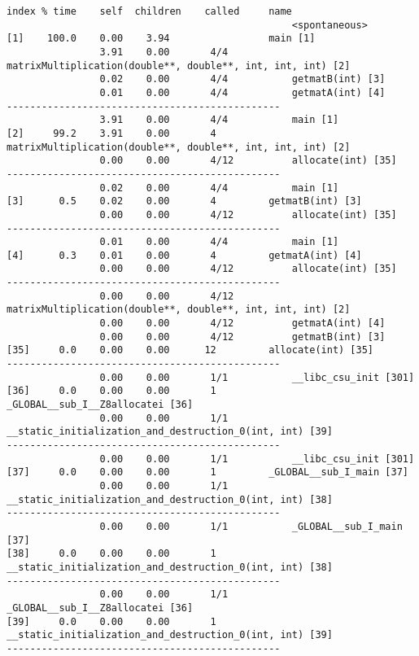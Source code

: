 \documentclass[7pt]{article}
\begin{document}
\begin{verbatim}
index % time    self  children    called     name
                                                 <spontaneous>
[1]    100.0    0.00    3.94                 main [1]
                3.91    0.00       4/4           matrixMultiplication(double**, double**, int, int, int) [2]
                0.02    0.00       4/4           getmatB(int) [3]
                0.01    0.00       4/4           getmatA(int) [4]
-----------------------------------------------
                3.91    0.00       4/4           main [1]
[2]     99.2    3.91    0.00       4         matrixMultiplication(double**, double**, int, int, int) [2]
                0.00    0.00       4/12          allocate(int) [35]
-----------------------------------------------
                0.02    0.00       4/4           main [1]
[3]      0.5    0.02    0.00       4         getmatB(int) [3]
                0.00    0.00       4/12          allocate(int) [35]
-----------------------------------------------
                0.01    0.00       4/4           main [1]
[4]      0.3    0.01    0.00       4         getmatA(int) [4]
                0.00    0.00       4/12          allocate(int) [35]
-----------------------------------------------
                0.00    0.00       4/12          matrixMultiplication(double**, double**, int, int, int) [2]
                0.00    0.00       4/12          getmatA(int) [4]
                0.00    0.00       4/12          getmatB(int) [3]
[35]     0.0    0.00    0.00      12         allocate(int) [35]
-----------------------------------------------
                0.00    0.00       1/1           __libc_csu_init [301]
[36]     0.0    0.00    0.00       1         _GLOBAL__sub_I__Z8allocatei [36]
                0.00    0.00       1/1           __static_initialization_and_destruction_0(int, int) [39]
-----------------------------------------------
                0.00    0.00       1/1           __libc_csu_init [301]
[37]     0.0    0.00    0.00       1         _GLOBAL__sub_I_main [37]
                0.00    0.00       1/1           __static_initialization_and_destruction_0(int, int) [38]
-----------------------------------------------
                0.00    0.00       1/1           _GLOBAL__sub_I_main [37]
[38]     0.0    0.00    0.00       1         __static_initialization_and_destruction_0(int, int) [38]
-----------------------------------------------
                0.00    0.00       1/1           _GLOBAL__sub_I__Z8allocatei [36]
[39]     0.0    0.00    0.00       1         __static_initialization_and_destruction_0(int, int) [39]
-----------------------------------------------
\end{verbatim}
\end{document}
